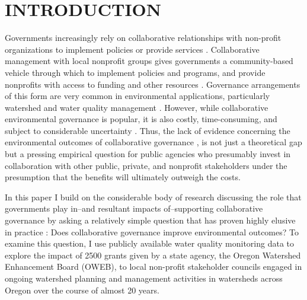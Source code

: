 \documentclass[12pt,a4paper,titlepage]{article}
\begin{document}
\doublespacing

\section*{\bf\MakeUppercase{Introduction}}

Governments increasingly rely on collaborative relationships with non-profit organizations to implement policies or provide services \parencite{salamon2002}. Collaborative management with local nonprofit groups gives governments a community-based vehicle through which to implement policies and programs, and provide nonprofits with access to funding and other resources \parencite{nikolic2008}. Governance arrangements of this form are very common in environmental applications, particularly watershed and water quality management \parencite[e.g.,][]{leach2013,leach2002,margerum2011,hardy2008}. However, while collaborative environmental governance is popular, it is also costly, time-consuming, and subject to considerable uncertainty \parencite{margerum2011}. Thus, the lack of evidence concerning the environmental outcomes of collaborative governance \parencite{thomas2011}, is not just a theoretical gap but a pressing empirical question for public agencies who presumably invest in collaboration with other public, private, and nonprofit stakeholders under the presumption that the benefits will ultimately outweigh the costs.

In this paper I build on the considerable body of research discussing the role that governments play in--and resultant impacts of--supporting collaborative governance \parencite[e.g.,][]{nikolic2008,lubell2008,ansell2008,emerson2012} by asking a relatively simple question that has proven highly elusive in practice \parencite{koontz2006,carr2012}: Does collaborative governance improve environmental outcomes? To examine this question, I use publicly available water quality monitoring data to explore the impact of 2500 grants given by a state agency, the Oregon Watershed Enhancement Board (OWEB), to local non-profit stakeholder councils engaged in ongoing watershed planning and management activities in watersheds across Oregon over the course of almost 20 years.
\end{document}
